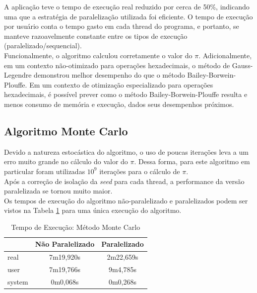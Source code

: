 \documentclass[12pt]{article}
\begin{document}
A aplicação teve o tempo de execução real reduzido por cerca de 50\%, indicando uma que a
estratégia de paralelização utilizada foi eficiente. O tempo de execução por usuário
conta o tempo gasto em cada thread do programa, e portanto, se manteve razoavelmente
constante entre os tipos de execução (paralelizado/sequencial).\\

Funcionalmente, o algoritmo calculou corretamente o valor do $\pi$. Adicionalmente,
em um contexto não-otimizado para operações hexadecimais, o método de Gauss-Legendre demonstrou
melhor desempenho do que o método Bailey-Borwein-Plouffe. Em um contexto de otimização
especializado para operações hexadecimais, é possível prever como o método
Bailey-Borwein-Plouffe resulta e menos consumo de memória e execução, dados seus desempenhos
próximos.\\

\subsection{Algoritmo Monte Carlo}

Devido a natureza estocástica do algoritmo, o uso de poucas iterações leva a um erro muito
grande no cálculo do valor do $\pi$. Dessa forma, para este algoritmo em particular foram
utilizadas $10^9$ iterações para o cálculo de $\pi$.\\

Após a correção de isolação da \textit{seed} para cada thread, a performance da versão
paralelizada se tornou muito maior.\\

Os tempos de execução do algoritmo não-paralelizado e paralelizados podem ser vistos
na Tabela \ref{tab:table04} para uma única execução do algoritmo.\\

\begin{table}[h]
	\centering
	\caption{Tempo de Execução: Método Monte Carlo}
	\begin{tabular}{|l|c|c|}
		\hline
		{}			& Não Paralelizado & Paralelizado \\
		\hline
		real 		& 7m19,920s	& 2m22,659s \\
		user 		& 7m19,766s	& 9m4,785s \\
		system	& 0m0,068s	& 0m0,268s \\
		\hline
	\end{tabular}
	\label{tab:table04}
\end{table}
\end{document}

